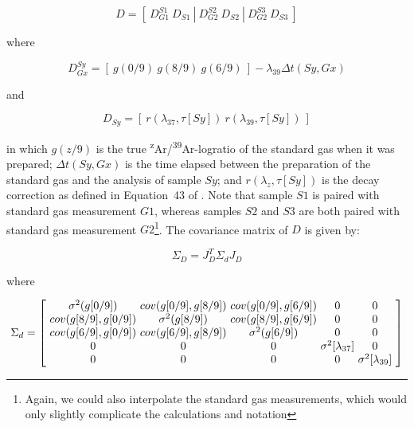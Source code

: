 \documentclass{article}
\begin{document}
\begin{equation}
  D = \left[~D_{G1}^{S1}~D_{S1}~|~D_{G2}^{S2}~D_{S2}~|~D_{G2}^{S3}~D_{S3}~\right]
\end{equation}

\noindent where

\begin{equation}
  D_{Gx}^{Sy} = \left[~g(0/9)~g(8/9)~g(6/9)~\right]
  - \lambda_{39}\Delta t(Sy,Gx)
\end{equation}

\noindent and

\begin{equation}
  D_{Sy} = \left[~r(\lambda_{37},\tau[Sy])~r(\lambda_{39},\tau[Sy])~\right]
\end{equation}

\noindent in which $g(z/9)$ is the true
\textsuperscript{z}Ar/\textsuperscript{39}Ar-logratio of the standard
gas when it was prepared; $\Delta t(Sy,Gx)$ is the time elapsed
between the preparation of the standard gas and the analysis of sample
$Sy$; and $r(\lambda_{z},\tau[Sy])$ is the decay correction as defined
in Equation~43 of \citet{vermeesch2015b}.  Note that sample $S1$ is
paired with standard gas measurement $G1$, whereas samples $S2$ and
$S3$ are both paired with standard gas measurement
$G2$\footnote{Again, we could also interpolate the standard gas
  measurements, which would only slightly complicate the calculations
  and notation}.  The covariance matrix of $D$ is given by:

\begin{equation}
  \Sigma_D = J_D^T \Sigma_d J_D
\end{equation}

\noindent where

\begin{equation}
  \Sigma_d =
  \left[
    \begin{array}{@{~}c@{~}c@{~}c@{~}c@{~}c@{~}}
      \sigma^2(g[0/9]) & cov(g[0/9],g[8/9]) & cov(g[0/9],g[6/9]) & 0 & 0 \\
      cov(g[8/9],g[0/9]) & \sigma^2(g[8/9]) & cov(g[8/9],g[6/9]) & 0 & 0 \\
      cov(g[6/9],g[0/9]) & cov(g[6/9],g[8/9]) & \sigma^2(g[6/9]) & 0 & 0 \\
      0 & 0 & 0 & \sigma^2[\lambda_{37}] & 0 \\
      0 & 0 & 0 & 0 & \sigma^2[\lambda_{39}]
    \end{array}
  \right]
\end{equation}
\end{document}
